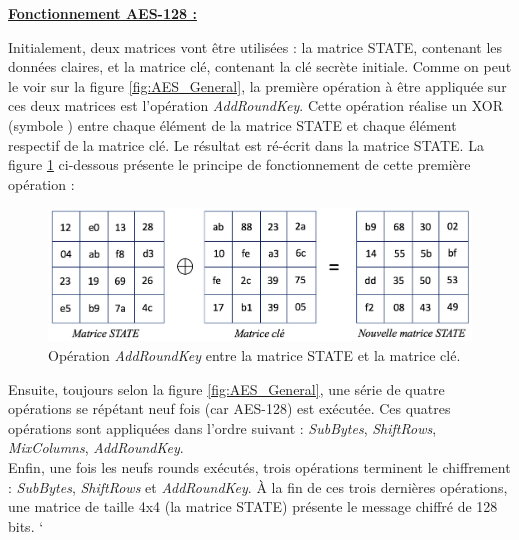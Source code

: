\documentclass[oneside]{book}
\begin{document}
\vspace{0.5cm}
\underline{\textbf{Fonctionnement AES-128 :}} 

\hspace{-0.5cm}Initialement, deux matrices vont être utilisées : la matrice STATE, contenant les données claires, et la matrice clé, contenant la clé secrète initiale. Comme on peut le voir sur la figure \ref{fig:AES_General}, la première opération à être appliquée sur ces deux matrices est l'opération \textit{AddRoundKey}. Cette opération réalise un XOR (symbole \oplus) entre chaque élément de la matrice STATE et chaque élément respectif de la matrice clé. Le résultat est ré-écrit dans la matrice STATE. La figure \ref{fig:XOR} ci-dessous présente le principe de fonctionnement de cette première opération :
\begin{figure}[htbp]
    \centering
    \includegraphics[scale=0.52]{image/XOR}
    \caption{Opération \textit{AddRoundKey} entre la matrice STATE et la matrice clé.}
    \label{fig:XOR}
\end{figure}

\hspace{-0.5 cm}Ensuite, toujours selon la figure \ref{fig:AES_General}, une série de quatre opérations se répétant neuf fois (car AES-128) est exécutée. Ces quatres opérations sont appliquées dans l'ordre suivant : \textit{SubBytes}, \textit{ShiftRows}, \textit{MixColumns}, \textit{AddRoundKey}. \\
Enfin, une fois les neufs rounds exécutés, trois opérations terminent le chiffrement : \textit{SubBytes}, \textit{ShiftRows} et \textit{AddRoundKey}. À la fin de ces trois dernières opérations, une matrice de taille 4x4 (la matrice STATE) présente le message chiffré de 128 bits.
`
\end{document}

